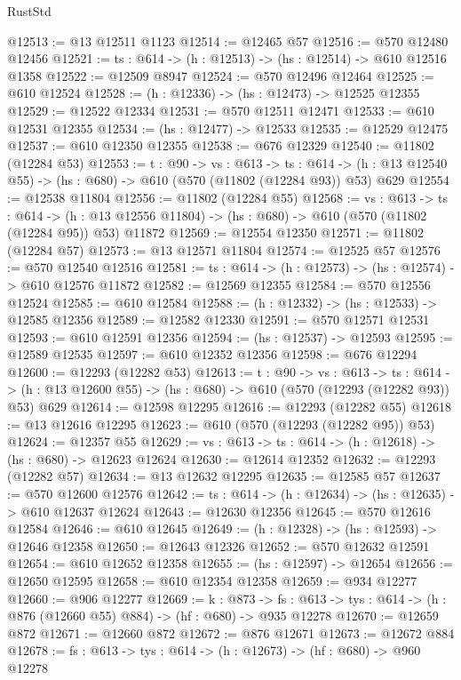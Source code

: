 \begin{lexlean}{RustStd}
\begin{coremodule}
@12513 := @13 @12511 @1123
@12514 := @12465 @57
@12516 := @570 @12480 @12456
@12521 := {ts : @614} -> (h : @12513) -> (hs : @12514) -> @610 @12516 @1358
@12522 := @12509 @8947
@12524 := @570 @12496 @12464
@12525 := @610 @12524
@12528 := (h : @12336) -> (hs : @12473) -> @12525 @12355
@12529 := @12522 @12334
@12531 := @570 @12511 @12471
@12533 := @610 @12531 @12355
@12534 := (hs : @12477) -> @12533
@12535 := @12529 @12475
@12537 := @610 @12350 @12355
@12538 := @676 @12329
@12540 := @11802 (@12284 @53)
@12553 := {t : @90} ->
  {vs : @613} ->
  {ts : @614} -> (h : @13 @12540 @55) -> (hs : @680) -> @610 (@570 (@11802 (@12284 @93)) @53) @629
@12554 := @12538 @11804
@12556 := @11802 (@12284 @55)
@12568 := {vs : @613} ->
  {ts : @614} ->
  (h : @13 @12556 @11804) -> (hs : @680) -> @610 (@570 (@11802 (@12284 @95)) @53) @11872
@12569 := @12554 @12350
@12571 := @11802 (@12284 @57)
@12573 := @13 @12571 @11804
@12574 := @12525 @57
@12576 := @570 @12540 @12516
@12581 := {ts : @614} -> (h : @12573) -> (hs : @12574) -> @610 @12576 @11872
@12582 := @12569 @12355
@12584 := @570 @12556 @12524
@12585 := @610 @12584
@12588 := (h : @12332) -> (hs : @12533) -> @12585 @12356
@12589 := @12582 @12330
@12591 := @570 @12571 @12531
@12593 := @610 @12591 @12356
@12594 := (hs : @12537) -> @12593
@12595 := @12589 @12535
@12597 := @610 @12352 @12356
@12598 := @676 @12294
@12600 := @12293 (@12282 @53)
@12613 := {t : @90} ->
  {vs : @613} ->
  {ts : @614} -> (h : @13 @12600 @55) -> (hs : @680) -> @610 (@570 (@12293 (@12282 @93)) @53) @629
@12614 := @12598 @12295
@12616 := @12293 (@12282 @55)
@12618 := @13 @12616 @12295
@12623 := @610 (@570 (@12293 (@12282 @95)) @53)
@12624 := @12357 @55
@12629 := {vs : @613} -> {ts : @614} -> (h : @12618) -> (hs : @680) -> @12623 @12624
@12630 := @12614 @12352
@12632 := @12293 (@12282 @57)
@12634 := @13 @12632 @12295
@12635 := @12585 @57
@12637 := @570 @12600 @12576
@12642 := {ts : @614} -> (h : @12634) -> (hs : @12635) -> @610 @12637 @12624
@12643 := @12630 @12356
@12645 := @570 @12616 @12584
@12646 := @610 @12645
@12649 := (h : @12328) -> (hs : @12593) -> @12646 @12358
@12650 := @12643 @12326
@12652 := @570 @12632 @12591
@12654 := @610 @12652 @12358
@12655 := (hs : @12597) -> @12654
@12656 := @12650 @12595
@12658 := @610 @12354 @12358
@12659 := @934 @12277
@12660 := @906 @12277
@12669 := {k : @873} ->
  {fs : @613} -> {tys : @614} -> (h : @876 (@12660 @55) @884) -> (hf : @680) -> @935 @12278
@12670 := @12659 @872
@12671 := @12660 @872
@12672 := @876 @12671
@12673 := @12672 @884
@12678 := {fs : @613} -> {tys : @614} -> (h : @12673) -> (hf : @680) -> @960 @12278

\end{coremodule}
\end{lexlean}
